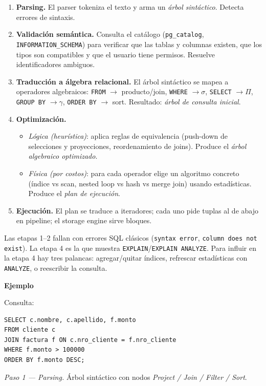 \documentclass[11pt,a4paper]{article}
\newcommand{\itemcabecera}[1]{\noindent\textbf{#1}\par\medskip}
\newcommand{\bloqueEjemplo}{\itemcabecera{Ejemplo}}
\begin{document}
\begin{enumerate}
    \item \textbf{Parsing.} El parser tokeniza el texto y arma un \emph{árbol sintáctico}. Detecta errores de sintaxis.
    \item \textbf{Validación semántica.} Consulta el catálogo (\texttt{pg\_catalog}, \texttt{INFORMATION\_SCHEMA}) para verificar que las tablas y columnas existen, que los tipos son compatibles y que el usuario tiene permisos. Resuelve identificadores ambiguos.
    \item \textbf{Traducción a álgebra relacional.} El árbol sintáctico se mapea a operadores algebraicos: \texttt{FROM} $\to$ producto/join, \texttt{WHERE} $\to \sigma$, \texttt{SELECT} $\to \Pi$, \texttt{GROUP BY} $\to \gamma$, \texttt{ORDER BY} $\to$ sort. Resultado: \emph{árbol de consulta inicial}.
    \item \textbf{Optimización.}
    \begin{itemize}
        \item \emph{Lógica (heurística)}: aplica reglas de equivalencia (push-down de selecciones y proyecciones, reordenamiento de joins). Produce el \emph{árbol algebraico optimizado}.
        \item \emph{Física (por costos)}: para cada operador elige un algoritmo concreto (índice vs scan, nested loop vs hash vs merge join) usando estadísticas. Produce el \emph{plan de ejecución}.
    \end{itemize}
    \item \textbf{Ejecución.} El plan se traduce a iteradores; cada uno pide tuplas al de abajo en pipeline; el storage engine sirve bloques.
\end{enumerate}

Las etapas 1--2 fallan con errores SQL clásicos (\texttt{syntax error}, \texttt{column does not exist}). La etapa 4 es la que muestra \texttt{EXPLAIN}/\texttt{EXPLAIN ANALYZE}. Para influir en la etapa 4 hay tres palancas: agregar/quitar índices, refrescar estadísticas con \texttt{ANALYZE}, o reescribir la consulta.

\bloqueEjemplo

Consulta:

\begin{lstlisting}
SELECT c.nombre, c.apellido, f.monto
FROM cliente c
JOIN factura f ON c.nro_cliente = f.nro_cliente
WHERE f.monto > 100000
ORDER BY f.monto DESC;
\end{lstlisting}

\textit{Paso 1 --- Parsing.} Árbol sintáctico con nodos \emph{Project / Join / Filter / Sort}.
\end{document}
